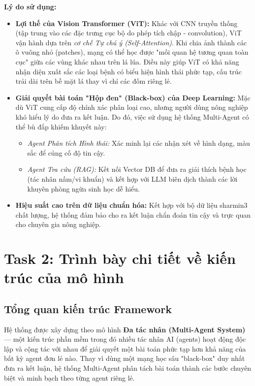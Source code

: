 \documentclass[12pt,a4paper]{article}
\begin{document}
\textbf{Lý do sử dụng:}
\begin{itemize}
    \item \textbf{Lợi thế của Vision Transformer (ViT):} Khác với CNN truyền thống (tập trung vào các đặc trưng cục bộ do phép tích chập - convolution), ViT vận hành dựa trên \textit{cơ chế Tự chú ý (Self-Attention)}. Khi chia ảnh thành các ô vuông nhỏ (patches), mạng có thể học được "mối quan hệ tương quan toàn cục" giữa các vùng khác nhau trên lá lúa. Điều này giúp ViT có khả năng nhận diện xuất sắc các loại bệnh có biểu hiện hình thái phức tạp, cấu trúc trải dài trên bề mặt lá thay vì chỉ các đốm riêng lẻ.
    \item \textbf{Giải quyết bài toán "Hộp đen" (Black-box) của Deep Learning:} Mặc dù ViT cung cấp độ chính xác phân loại cao, nhưng người dùng nông nghiệp khó hiểu lý do đưa ra kết luận. Do đó, việc sử dụng hệ thống Multi-Agent có thể bù đắp khiếm khuyết này:
    \begin{itemize}
        \item \textit{Agent Phân tích Hình thái:} Xác minh lại các nhận xét về hình dạng, màu sắc để củng cố độ tin cậy.
        \item \textit{Agent Tra cứu (RAG):} Kết nối Vector DB để đưa ra giải thích bệnh học (tác nhân nấm/vi khuẩn) và kết hợp với LLM biên dịch thành các lời khuyên phòng ngừa sinh học dễ hiểu.
    \end{itemize}
    \item \textbf{Hiệu suất cao trên dữ liệu chuẩn hóa:} Kết hợp với bộ dữ liệu sharmin3 chất lượng, hệ thống đảm bảo cho ra kết luận chẩn đoán tin cậy và trực quan cho chuyên gia nông nghiệp.
\end{itemize}


\newpage
\section{Task 2: Trình bày chi tiết về kiến trúc của mô hình}

\subsection{Tổng quan kiến trúc Framework}

Hệ thống được xây dựng theo mô hình \textbf{Đa tác nhân (Multi-Agent System)} --- một kiến trúc phần mềm trong đó nhiều tác nhân AI (agents) hoạt động độc lập và cộng tác với nhau để giải quyết một bài toán phức tạp hơn khả năng của bất kỳ agent đơn lẻ nào. Thay vì dùng một mạng học sâu "black-box" duy nhất đưa ra kết luận, hệ thống Multi-Agent phân tách bài toán thành các bước chuyên biệt và minh bạch theo từng agent riêng lẻ.
\end{document}
